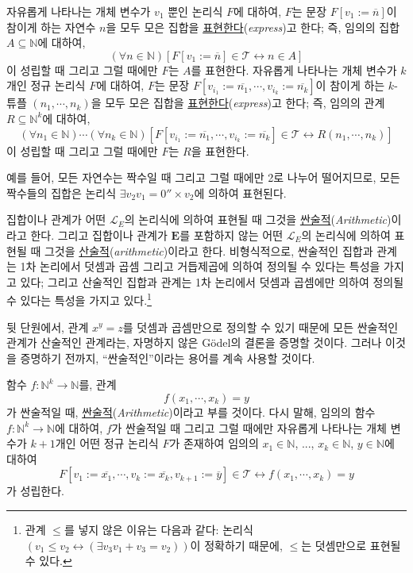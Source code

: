 \documentclass[12pt]{paper}
\begin{document}
자유롭게 나타나는 개체 변수가 $v_{1}$ 뿐인 논리식 $F$에 대하여,
$F$는 문장 $F \left[ v_{1} := \overline{n} \right]$이 참이게 하는 자연수 $n$을 모두 모은 집합을 \underline{표현한다}(\textit{express})고 한다;
즉, 임의의 집합 $A \subseteq \mathbb{N}$에 대하여, $$ \left( \forall n \in \mathbb{N} \right) \left[ F \left[ v_{1} := \overline{n} \right] \in \mathcal{T} \leftrightarrow n \in A \right] $$이 성립할 때 그리고 그럴 때에만 $F$는 $A$를 표현한다.
자유롭게 나타나는 개체 변수가 $k$개인 정규 논리식 $F$에 대하여,
$F$는 문장 $F \left[ v_{i_{1}} := \overline{n_{1}} , \cdots , v_{i_{k}} := \overline{n_{k}} \right]$이 참이게 하는 $k$-튜플 $\left( n_{1} , \cdots , n_{k} \right)$을 모두 모은 집합을 \underline{표현한다}(\textit{express})고 한다;
즉, 임의의 관계 $R \subseteq \mathbb{N}^{k}$에 대하여, $$ \left( \forall n_{1} \in \mathbb{N} \right) \cdots \left( \forall n_{k} \in \mathbb{N} \right) \left[ F \left[ v_{i_{1}} := \overline{n_{1}} , \cdots , v_{i_{k}} := \overline{n_{k}} \right] \in \mathcal{T} \leftrightarrow R \left( n_{1} , \cdots , n_{k} \right) \right] $$이 성립할 때 그리고 그럴 때에만 $F$는 $R$을 표현한다.

예를 들어, 모든 자연수는 짝수일 때 그리고 그럴 때에만 2로 나누어 떨어지므로, 모든 짝수들의 집합은 논리식 $\exists v_{2} v_{1} = 0'' \times v_{2}$에 의하여 표현된다.

집합이나 관계가 어떤 $\mathcal{L}_{E}$의 논리식에 의하여 표현될 때 그것을 \underline{싼술적}(\textit{Arithmetic})이라고 한다.
그리고 집합이나 관계가 $\mathbf{E}$를 포함하지 않는 어떤 $\mathcal{L}_{E}$의 논리식에 의하여 표현될 때 그것을 \underline{산술적}(\textit{arithmetic})이라고 한다.
비형식적으로, 싼술적인 집합과 관계는 1차 논리에서 덧셈과 곱셈 그리고 거듭제곱에 의하여 정의될 수 있다는 특성을 가지고 있다;
그리고 산술적인 집합과 관계는 1차 논리에서 덧셈과 곱셈에만 의하여 정의될 수 있다는 특성을 가지고 있다.\footnote
{
관계 $\leq$를 넣지 않은 이유는 다음과 같다:
논리식 $\left( v_{1} \leq v_{2} \leftrightarrow \left( \exists v_{3} v_{1} + v_{3} = v_{2} \right) \right)$이 정확하기 때문에,
$\leq$는 덧셈만으로 표현될 수 있다.
}

뒷 단원에서, 관계 $x^{y} = z$를 덧셈과 곱셈만으로 정의할 수 있기 때문에 모든 싼술적인 관계가 산술적인 관계라는,
자명하지 않은 G\"odel의 결론을 증명할 것이다.
그러나 이것을 증명하기 전까지, ``싼술적인''이라는 용어를 계속 사용할 것이다.

함수 $f : \mathbb{N}^{k} \to \mathbb{N}$를, 관계 $$f \left( x_{1} , \cdots , x_{k} \right) = y$$가 싼술적일 때, \underline{싼술적}(\textit{Arithmetic})이라고 부를 것이다.
다시 말해, 임의의 함수 $f : \mathbb{N}^{k} \to \mathbb{N}$에 대하여, $f$가 싼술적일 때 그리고 그럴 때에만 자유롭게 나타나는 개체 변수가 $k + 1$개인 어떤 정규 논리식 $F$가 존재하여
임의의 $x_{1} \in \mathbb{N}$, ..., $x_{k} \in \mathbb{N}$, $y \in \mathbb{N}$에 대하여 $$ F \left[ v_{1} := \overline{x_1} , \cdots , v_{k} := \overline{x_k} , v_{k + 1} := \overline{y} \right] \in \mathcal{T} \leftrightarrow f \left( x_{1} , \cdots , x_{k} \right) = y $$가 성립한다.
\end{document}
